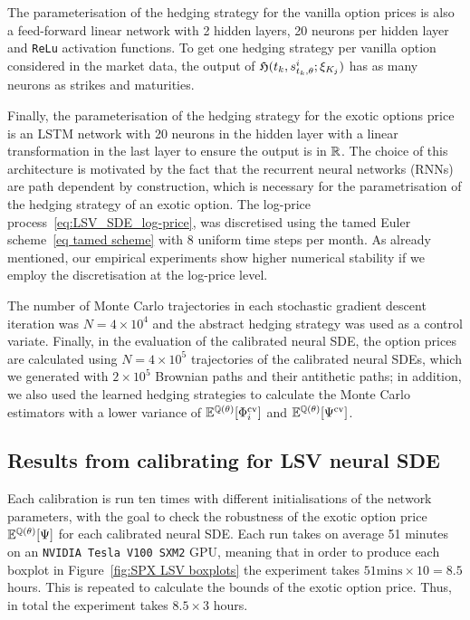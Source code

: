 The parameterisation of the hedging strategy for the vanilla option prices is also a feed-forward
linear network with 2 hidden layers, 20 neurons per hidden layer and \texttt{ReLu} activation functions. To get one hedging strategy per vanilla option 
considered in the market data, the output of $\mathfrak{H}(t_k, s_{t_k, \theta}^{i}; \xi_{K_j})$ has as many neurons as strikes and maturities.

Finally, the parameterisation of the hedging strategy for the exotic options price is an LSTM network \cite{Hochreiter1997LongMemory} with 20 neurons in the hidden layer with a linear transformation in the last layer to ensure the output is in $\mathbb{R}$. The choice of this architecture is motivated by the fact that the recurrent neural networks (RNNs) are path dependent by construction, which is necessary for the parametrisation of the hedging strategy of an exotic option. 
The log-price process~\eqref{eq:LSV_SDE_log-price}, was discretised using the tamed Euler scheme~\eqref{eq tamed scheme} with 8 uniform time steps per month. As already mentioned, our empirical experiments show higher numerical stability if we employ the discretisation at the log-price level.
 
The number of Monte Carlo trajectories in each stochastic gradient descent iteration was $N=4\times 10^4$ and the abstract hedging strategy was used as a control variate. Finally, in the evaluation of the calibrated neural SDE, the option prices are calculated using $N = 4\times 10^5$ trajectories of the calibrated neural SDEs, which we generated with $2\times 10^5$ Brownian paths and their antithetic paths; in addition, we also used the learned hedging strategies to calculate the Monte Carlo estimators with a lower variance of $\mathbb{E}^{\mathbb{Q}(\theta)}[\Phi_i^{\textup{cv}}]$ and $\mathbb{E}^{\mathbb{Q}(\theta)}[\Psi^{\textup{cv}}]$.

\subsection{Results from calibrating for LSV neural SDE}
Each calibration is run ten times with different initialisations of the network parameters, with the goal to check the robustness of the exotic option price 
 $\mathbb{E}^{\mathbb{Q}(\theta)}[\Psi]$ for each calibrated neural SDE. Each run takes on average 51 minutes on an \texttt{NVIDIA~Tesla~V100~SXM2} GPU, meaning that in order to produce each boxplot in Figure~\ref{fig:SPX LSV boxplots} the experiment takes $51 \text{mins} \times 10 = 8.5$ hours. This is repeated to calculate the bounds of the exotic option price. Thus, in total the experiment takes $8.5 \times 3$ hours.

